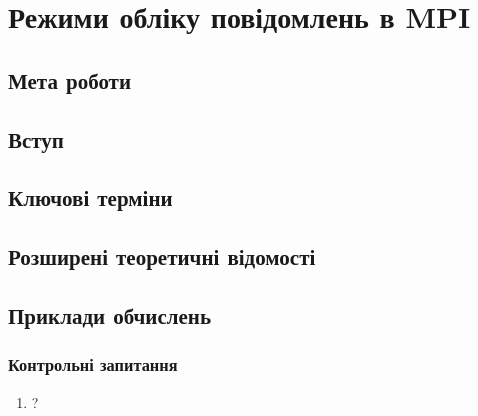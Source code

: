 \chapter{Режими обліку повідомлень в MPI}
\nopagebreak[4]
\section*{Мета роботи}

\nopagebreak[4]
\section{Вступ}
\nopagebreak[4]


\section{Ключові терміни}
\nopagebreak[4]




\section{Розширені теоретичні відомості}
\nopagebreak[4]




\section{Приклади обчислень}
\nopagebreak[4]




\subsection*{Контрольні запитання}
\nopagebreak[4]
\begin{enumerate}
\item ?
\end{enumerate}



